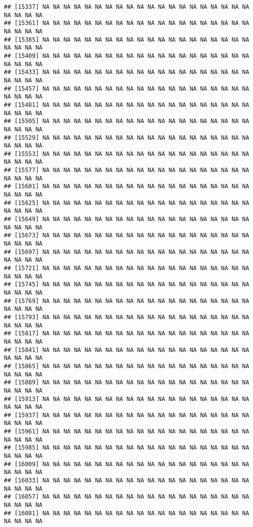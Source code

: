 \documentclass[
]{article}
\begin{document}
\begin{verbatim}
## [15337] NA NA NA NA NA NA NA NA NA NA NA NA NA NA NA NA NA NA NA NA NA NA NA NA
## [15361] NA NA NA NA NA NA NA NA NA NA NA NA NA NA NA NA NA NA NA NA NA NA NA NA
## [15385] NA NA NA NA NA NA NA NA NA NA NA NA NA NA NA NA NA NA NA NA NA NA NA NA
## [15409] NA NA NA NA NA NA NA NA NA NA NA NA NA NA NA NA NA NA NA NA NA NA NA NA
## [15433] NA NA NA NA NA NA NA NA NA NA NA NA NA NA NA NA NA NA NA NA NA NA NA NA
## [15457] NA NA NA NA NA NA NA NA NA NA NA NA NA NA NA NA NA NA NA NA NA NA NA NA
## [15481] NA NA NA NA NA NA NA NA NA NA NA NA NA NA NA NA NA NA NA NA NA NA NA NA
## [15505] NA NA NA NA NA NA NA NA NA NA NA NA NA NA NA NA NA NA NA NA NA NA NA NA
## [15529] NA NA NA NA NA NA NA NA NA NA NA NA NA NA NA NA NA NA NA NA NA NA NA NA
## [15553] NA NA NA NA NA NA NA NA NA NA NA NA NA NA NA NA NA NA NA NA NA NA NA NA
## [15577] NA NA NA NA NA NA NA NA NA NA NA NA NA NA NA NA NA NA NA NA NA NA NA NA
## [15601] NA NA NA NA NA NA NA NA NA NA NA NA NA NA NA NA NA NA NA NA NA NA NA NA
## [15625] NA NA NA NA NA NA NA NA NA NA NA NA NA NA NA NA NA NA NA NA NA NA NA NA
## [15649] NA NA NA NA NA NA NA NA NA NA NA NA NA NA NA NA NA NA NA NA NA NA NA NA
## [15673] NA NA NA NA NA NA NA NA NA NA NA NA NA NA NA NA NA NA NA NA NA NA NA NA
## [15697] NA NA NA NA NA NA NA NA NA NA NA NA NA NA NA NA NA NA NA NA NA NA NA NA
## [15721] NA NA NA NA NA NA NA NA NA NA NA NA NA NA NA NA NA NA NA NA NA NA NA NA
## [15745] NA NA NA NA NA NA NA NA NA NA NA NA NA NA NA NA NA NA NA NA NA NA NA NA
## [15769] NA NA NA NA NA NA NA NA NA NA NA NA NA NA NA NA NA NA NA NA NA NA NA NA
## [15793] NA NA NA NA NA NA NA NA NA NA NA NA NA NA NA NA NA NA NA NA NA NA NA NA
## [15817] NA NA NA NA NA NA NA NA NA NA NA NA NA NA NA NA NA NA NA NA NA NA NA NA
## [15841] NA NA NA NA NA NA NA NA NA NA NA NA NA NA NA NA NA NA NA NA NA NA NA NA
## [15865] NA NA NA NA NA NA NA NA NA NA NA NA NA NA NA NA NA NA NA NA NA NA NA NA
## [15889] NA NA NA NA NA NA NA NA NA NA NA NA NA NA NA NA NA NA NA NA NA NA NA NA
## [15913] NA NA NA NA NA NA NA NA NA NA NA NA NA NA NA NA NA NA NA NA NA NA NA NA
## [15937] NA NA NA NA NA NA NA NA NA NA NA NA NA NA NA NA NA NA NA NA NA NA NA NA
## [15961] NA NA NA NA NA NA NA NA NA NA NA NA NA NA NA NA NA NA NA NA NA NA NA NA
## [15985] NA NA NA NA NA NA NA NA NA NA NA NA NA NA NA NA NA NA NA NA NA NA NA NA
## [16009] NA NA NA NA NA NA NA NA NA NA NA NA NA NA NA NA NA NA NA NA NA NA NA NA
## [16033] NA NA NA NA NA NA NA NA NA NA NA NA NA NA NA NA NA NA NA NA NA NA NA NA
## [16057] NA NA NA NA NA NA NA NA NA NA NA NA NA NA NA NA NA NA NA NA NA NA NA NA
## [16081] NA NA NA NA NA NA NA NA NA NA NA NA NA NA NA NA NA NA NA NA NA NA NA NA

\end{verbatim}
\end{document}
